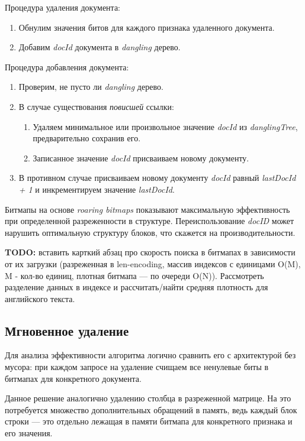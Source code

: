 Процедура удаления документа:
\begin{enumerate}
    \item Обнулим значения битов для каждого признака удаленного документа.
    \item Добавим \textit{docId} документа в \textit{dangling} дерево.
\end{enumerate}

Процедура добавления документа:
\begin{enumerate}
    \item Проверим, не пусто ли \textit{dangling} дерево.
    \item В случае существования \textit{повисшей} ссылки:
    \begin{enumerate}
        \item Удаляем минимальное или произвольное значение \textit{docId} из
        \textit{danglingTree}, предварительно сохранив его.
        \item Записанное значение \textit{docId} присваиваем новому документу.
    \end{enumerate}
    \item В противном случае присваиваем новому документу \textit{docId} равный
    \textit{lastDocId + 1} и инкрементируем значение \textit{lastDocId}.
\end{enumerate}

Битмапы на основе \textit{roaring bitmaps} показывают максимальную эффективность
при определенной разреженности в структуре. Переиспользование \textit{docID}
может нарушить оптимальную структуру блоков, что скажется на производительности.

\textbf{TODO:} вставить карткий абзац про скорость поиска в битмапах в зависимости
от их загрузки (разреженная в len-encoding, массив индексов с единицами O(M), M
- кол-во единиц, плотная битмапа — по очереди O(N)). Рассмотреть разделение данных
в индексе и рассчитать/найти средняя плотность для английского текста.

\subsection{Мгновенное удаление}

Для анализа эффективности алгоритма логично сравнить его с архитектурой без мусора:
при каждом запросе на удаление счищаем все ненулевые биты в битмапах для конкретного
документа.

Данное решение аналогично удалению столбца в разреженной матрице. На это потребуется
множество дополнительных обращений в память, ведь каждый блок строки — это
отдельно лежащая в памяти битмапа для конкретного признака и его значения.

